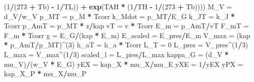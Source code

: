 \documentclass[]{article}
\newenvironment{Shaded}{\begin{snugshade}}{\end{snugshade}}
\newcommand{\KeywordTok}[1]{\textcolor[rgb]{0.13,0.29,0.53}{\textbf{#1}}}
\newcommand{\DecValTok}[1]{\textcolor[rgb]{0.00,0.00,0.81}{#1}}
\newcommand{\StringTok}[1]{\textcolor[rgb]{0.31,0.60,0.02}{#1}}
\newcommand{\OperatorTok}[1]{\textcolor[rgb]{0.81,0.36,0.00}{\textbf{#1}}}
\newcommand{\NormalTok}[1]{#1}
\begin{document}
\begin{Shaded}
\begin{Highlighting}[]
{{{\StringTok{        }\NormalTok{(}\DecValTok{1}\OperatorTok{/}\NormalTok{(}\DecValTok{273} \OperatorTok{+}\StringTok{ }\NormalTok{Tb) }\OperatorTok{-}\StringTok{ }\DecValTok{1}\OperatorTok{/}\NormalTok{TL)) }\OperatorTok{+}\StringTok{ }\KeywordTok{exp}\NormalTok{(TAH }\OperatorTok{*}\StringTok{ }\NormalTok{(}\DecValTok{1}\OperatorTok{/}\NormalTok{TH }\OperatorTok{-}\StringTok{ }\DecValTok{1}\OperatorTok{/}\NormalTok{(}\DecValTok{273} \OperatorTok{+}\StringTok{ }\NormalTok{Tb))))}
\NormalTok{    M_V =}\StringTok{ }\NormalTok{d_V}\OperatorTok{/}\NormalTok{w_V}
\NormalTok{    p_MT =}\StringTok{ }\NormalTok{p_M }\OperatorTok{*}\StringTok{ }\NormalTok{Tcorr}
\NormalTok{    k_Mdot =}\StringTok{ }\NormalTok{p_MT}\OperatorTok{/}\NormalTok{E_G}
\NormalTok{    k_JT =}\StringTok{ }\NormalTok{k_J }\OperatorTok{*}\StringTok{ }\NormalTok{Tcorr}
\NormalTok{    p_AmT =}\StringTok{ }\NormalTok{p_MT }\OperatorTok{*}\StringTok{ }\NormalTok{z}\OperatorTok{/}\NormalTok{kap}
\NormalTok{    vT =}\StringTok{ }\NormalTok{v }\OperatorTok{*}\StringTok{ }\NormalTok{Tcorr}
\NormalTok{    E_m =}\StringTok{ }\NormalTok{p_AmT}\OperatorTok{/}\NormalTok{vT}
\NormalTok{    F_mT =}\StringTok{ }\NormalTok{F_m }\OperatorTok{*}\StringTok{ }\NormalTok{Tcorr}
\NormalTok{    g =}\StringTok{ }\NormalTok{E_G}\OperatorTok{/}\NormalTok{(kap }\OperatorTok{*}\StringTok{ }\NormalTok{E_m)}
\NormalTok{    E_scaled =}\StringTok{ }\NormalTok{E_pres}\OperatorTok{/}\NormalTok{E_m}
\NormalTok{    V_max =}\StringTok{ }\NormalTok{(kap }\OperatorTok{*}\StringTok{ }\NormalTok{p_AmT}\OperatorTok{/}\NormalTok{p_MT)}\OperatorTok{^}\NormalTok{(}\DecValTok{3}\NormalTok{)}
\NormalTok{    h_aT =}\StringTok{ }\NormalTok{h_a }\OperatorTok{*}\StringTok{ }\NormalTok{Tcorr}
\NormalTok{    L_T =}\StringTok{ }\DecValTok{0}
\NormalTok{    L_pres =}\StringTok{ }\NormalTok{V_pres}\OperatorTok{^}\NormalTok{(}\DecValTok{1}\OperatorTok{/}\DecValTok{3}\NormalTok{)}
\NormalTok{    L_max =}\StringTok{ }\NormalTok{V_max}\OperatorTok{^}\NormalTok{(}\DecValTok{1}\OperatorTok{/}\DecValTok{3}\NormalTok{)}
\NormalTok{    scaled_l =}\StringTok{ }\NormalTok{L_pres}\OperatorTok{/}\NormalTok{L_max}
\NormalTok{    kappa_G =}\StringTok{ }\NormalTok{(d_V }\OperatorTok{*}\StringTok{ }\NormalTok{mu_V)}\OperatorTok{/}\NormalTok{(w_V }\OperatorTok{*}\StringTok{ }\NormalTok{E_G)}
\NormalTok{    yEX =}\StringTok{ }\NormalTok{kap_X }\OperatorTok{*}\StringTok{ }\NormalTok{mu_X}\OperatorTok{/}\NormalTok{mu_E}
\NormalTok{    yXE =}\StringTok{ }\DecValTok{1}\OperatorTok{/}\NormalTok{yEX}
\NormalTok{    yPX =}\StringTok{ }\NormalTok{kap_X_P }\OperatorTok{*}\StringTok{ }\NormalTok{mu_X}\OperatorTok{/}\NormalTok{mu_P}
}}}
\end{Highlighting}
\end{Shaded}
\end{document}
